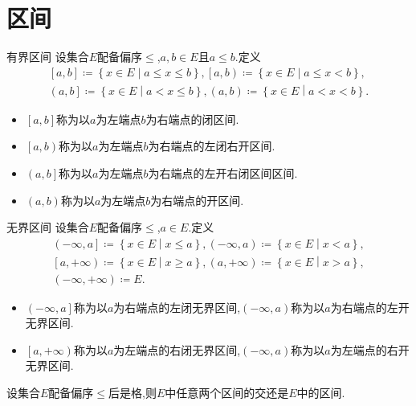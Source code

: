 \section{区间}

\begin{definition}{有界区间}{}
	设集合$E$配备偏序$\leq$,$a,b\in E$且$a\leq b$.定义
	\begin{gather*}
		\left[a,b\right]\coloneq\left\{x\in E\middle|a\leq x\leq b\right\},\left[a,b\right)\coloneq\left\{x\in E\middle|a\leq x<b\right\},\\
		\left(a,b\right]\coloneq\left\{x\in E\middle|a<x\leq b\right\},\left(a,b\right)\coloneq\left\{x\in E\middle|a<x<b\right\}.
	\end{gather*}
	\begin{itemize}
		\item $\left[a,b\right]$称为以$a$为左端点$b$为右端点的闭区间.
		\item $\left[a,b\right)$称为以$a$为左端点$b$为右端点的左闭右开区间.
		\item $\left(a,b\right]$称为以$a$为左端点$b$为右端点的左开右闭区间区间.
		\item $\left(a,b\right)$称为以$a$为左端点$b$为右端点的开区间.
	\end{itemize}
\end{definition}

\begin{definition}{无界区间}{}
	设集合$E$配备偏序$\leq$,$a\in E$.定义
	\begin{gather*}
		\left(-\infty,a\right]\coloneq\left\{x\in E\middle|x\leq a\right\},\left(-\infty,a\right)\coloneq\left\{x\in E\middle|x<a\right\},\\
		\left[a,+\infty\right)\coloneq\left\{x\in E\middle|x\geq a\right\},\left(a,+\infty\right)\coloneq\left\{x\in E\middle|x>a\right\},\\
		\left(-\infty,+\infty\right)\coloneq E.
	\end{gather*}
	\begin{itemize}
		\item $\left(-\infty,a\right]$称为以$a$为右端点的左闭无界区间,$\left(-\infty,a\right)$称为以$a$为右端点的左开无界区间.
		\item $\left[a,+\infty\right)$称为以$a$为左端点的右闭无界区间,$\left(-\infty,a\right)$称为以$a$为左端点的右开无界区间.
	\end{itemize}
\end{definition}

\begin{proposition}{}{}
	设集合$E$配备偏序$\leq$后是格,则$E$中任意两个区间的交还是$E$中的区间.
\end{proposition}


















